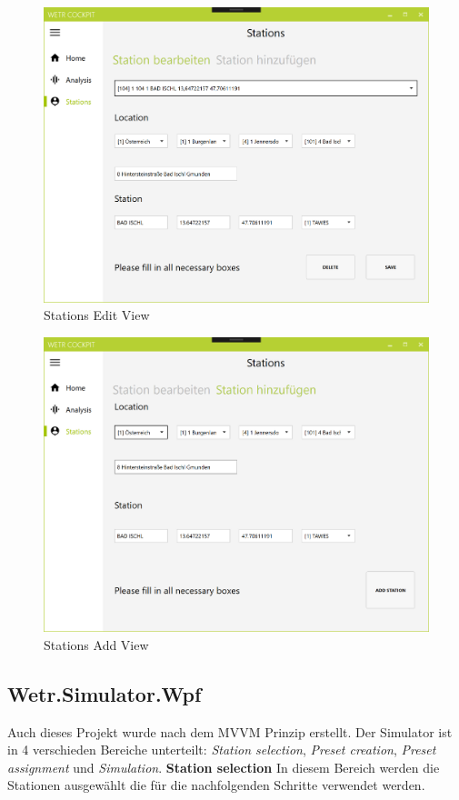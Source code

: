 \begin{figure}[H]
\centering
\includegraphics[width=.7\textwidth]{pictures/Cockpit/Cockpit_4.png}
\caption{Stations Edit View}
\label{fig:Wetr.Cockpit.Wpf.Station.Edit}
\end{figure}
\raggedright

\begin{figure}[H]
\centering
\includegraphics[width=.7\textwidth]{pictures/Cockpit/Cockpit_5.png}
\caption{Stations Add View}
\label{fig:Wetr.Cockpit.Wpf.Station.Add}
\end{figure}
\raggedright

\newpage
\subsection{Wetr.Simulator.Wpf}
Auch dieses Projekt wurde nach dem MVVM Prinzip erstellt.
Der Simulator ist in 4 verschieden Bereiche unterteilt: \textit{Station selection}, \textit{Preset creation}, \textit{Preset assignment} und \textit{Simulation}.
\newline
\newline
\textbf{Station selection}\newline
In diesem Bereich werden die Stationen ausgewählt die für die nachfolgenden Schritte verwendet werden.

